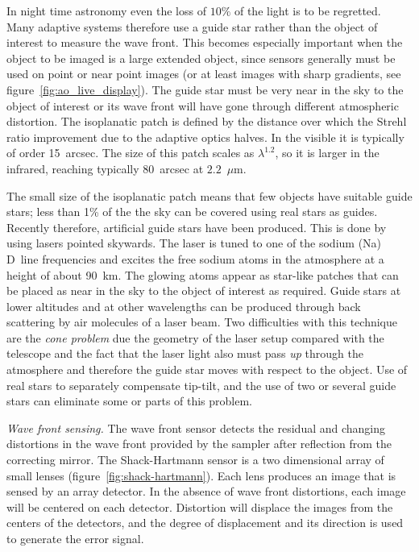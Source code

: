 In night time astronomy even the loss of $10\%$ of the light is to be 
regretted. Many adaptive systems therefore use a guide star rather than the
object of interest to measure the wave front. This becomes especially important
when the object to be imaged is a large extended object, since sensors 
generally must be used on point or near point images (or at least images with
sharp gradients, see figure~\ref{fig:ao_live_display}). The guide star
must be very near in the sky to the object of interest or its wave front will
have gone through different atmospheric distortion. The isoplanatic patch
is defined by the distance over which the Strehl ratio improvement due to
the adaptive optics halves. In the visible it is typically of order
15~arcsec. The size of this patch scales as $\lambda^{1.2}$, so it is larger
in the infrared, reaching typically 80~arcsec at $2.2$~$\mu$m.

The small size of the isoplanatic patch means that few objects have suitable
guide stars; less than 1\% of the the sky can be covered using real stars
as guides. Recently therefore, artificial guide stars have been produced. 
This is done by using lasers pointed skywards. The laser is tuned to one of 
the sodium (Na) D~line frequencies and excites the free sodium atoms in the
atmosphere at a height of about 90~km. The glowing atoms appear as star-like
patches that can be placed as near in the sky to the object of interest as
required. Guide stars at lower altitudes and at other wavelengths can be 
produced through back scattering by air molecules of a laser beam. 
Two difficulties with this technique are the {\it cone problem} due the
geometry of the laser setup compared with the telescope and the fact that
the laser light also must pass {\it up} through the atmosphere and therefore
the guide star moves with respect to the object. Use of real stars to separately
compensate tip-tilt, and the use of two or several guide stars can eliminate
some or parts of this problem.

\noindent
{\it Wave front sensing.} The wave front sensor detects the residual and 
changing distortions in the wave front provided by the sampler after 
reflection from the correcting mirror. The Shack-Hartmann sensor is a two
dimensional array of small lenses (figure~\ref{fig:shack-hartmann}). Each
lens produces an image that is sensed by an array detector. In the absence
of wave front distortions, each image will be centered on each detector.
Distortion will displace the images from the centers of the detectors, and
the degree of displacement and its direction is used to generate the error
signal. 

